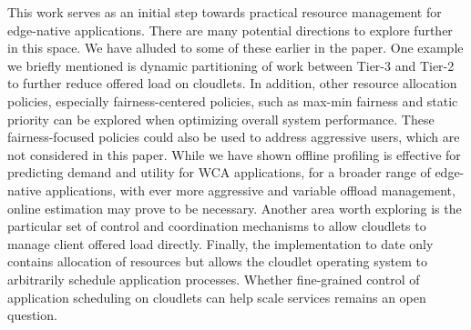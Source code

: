 This work serves as an initial step towards practical resource management for
edge-native applications. There are many potential directions to explore further
in this space. We have alluded to some of these earlier in the paper. One
example we briefly mentioned is dynamic partitioning of work between Tier-3 and
Tier-2 to further reduce offered load on cloudlets.  In addition, other resource
allocation policies, especially fairness-centered policies, such as max-min
fairness and static priority can be explored when optimizing overall system
performance. These fairness-focused policies could also be used to address
aggressive users, which are not considered in this paper.  While we have shown
offline profiling is effective for predicting demand and utility for WCA
applications, for a broader range of edge-native applications, with ever more
aggressive and variable offload management, online estimation may prove to be
necessary. Another area worth exploring is the particular set of control and
coordination mechanisms to allow cloudlets to manage client offered load
directly. Finally, the implementation to date only contains allocation of
resources but allows the cloudlet operating system to arbitrarily schedule
application processes.  Whether fine-grained control of application scheduling
on cloudlets can help scale services remains an open question.


